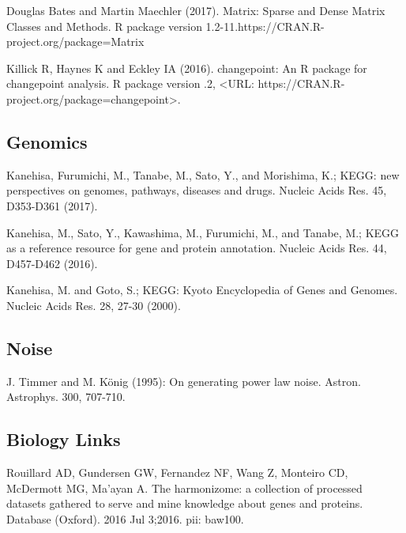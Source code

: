 \begin{thebibliography}{00}
	 Douglas Bates and Martin Maechler (2017). 
	\newblock Matrix: Sparse and Dense Matrix Classes and Methods. 
	\newblock R package version 1.2-11.https://CRAN.R-project.org/package=Matrix
	
	 Killick R, Haynes K and Eckley IA (2016).
	\newblock changepoint: An R package for changepoint analysis. R package version
	.2, <URL: https://CRAN.R-project.org/package=changepoint>.
	
\subsection{Genomics}
	
	 Kanehisa, Furumichi, M., Tanabe, M., Sato, Y., and Morishima, K.; 
	\newblock KEGG: new perspectives on genomes, pathways, diseases and drugs. 
	\newblock Nucleic Acids Res. 45, D353-D361 (2017).
	
	 Kanehisa, M., Sato, Y., Kawashima, M., Furumichi, M., and Tanabe, M.; 
	\newblock KEGG as a reference resource for gene and protein annotation. 
	\newblock Nucleic Acids Res. 44, D457-D462 (2016).
	
	 Kanehisa, M. and Goto, S.; 
	\newblock KEGG: Kyoto Encyclopedia of Genes and Genomes. 
	\newblock Nucleic Acids Res. 28, 27-30 (2000). 
	

\subsection{Noise}

	 J. Timmer and M. König (1995): 
	\newblock On generating power law noise. 
	\newblock Astron. Astrophys. 300, 707-710.
	
	
\subsection{Biology Links}

 Rouillard AD, Gundersen GW, Fernandez NF, Wang Z, Monteiro CD, McDermott MG, Ma'ayan A. 
\newblock The harmonizome: a collection of processed datasets gathered to serve and mine knowledge about genes and proteins. 
\newblock Database (Oxford). 2016 Jul 3;2016. pii: baw100. 

	
\end{thebibliography}

